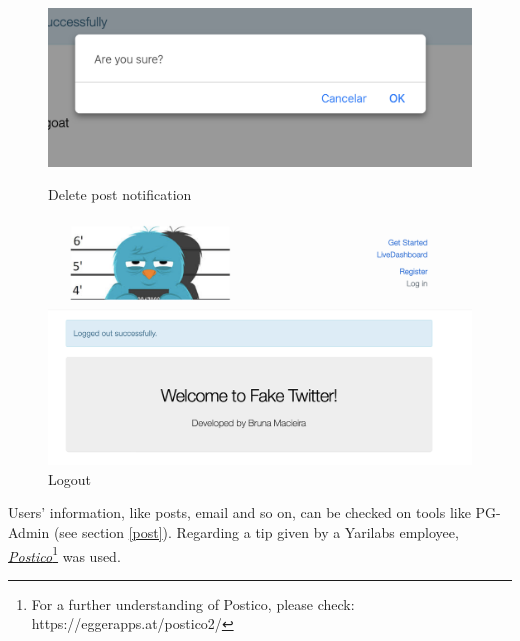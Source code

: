 \begin{figure}[htbp]
	\centering
	
	\begin{minipage}[b]{0.45\textwidth}
		\centering
		\includegraphics[width=\linewidth]{figures/delete.png}
		\caption{Delete post notification}
		\label{fig:delete}
	\end{minipage}
	\hfill
	\begin{minipage}[b]{0.45\textwidth}
		\centering
		\includegraphics[width=\linewidth]{figures/logout.png}
		\caption{Logout}
		\label{fig:logout}
	\end{minipage}

\end{figure}



Users' information, like posts, email and so on, can be checked on tools like PG-Admin (see section \ref{post}). Regarding a tip given by a Yarilabs employee, \href{https://eggerapps.at/postico2/}{\textit{Postico}}\footnote{For a further understanding of Postico, please check: https://eggerapps.at/postico2/} was used.


